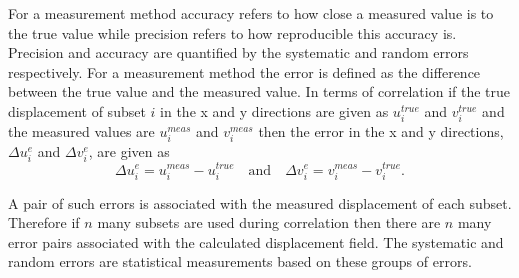 \documentclass[12pt,oneside,openany,a4paper, %
english, %
masters-t, goldenblock]{usthesis}
\begin{document}
For a measurement method accuracy refers to how close a measured value is to the true value while precision refers to how reproducible this accuracy is. Precision and accuracy are quantified by the systematic and random errors respectively. For a measurement method the error is defined as the difference between the true value and the measured value. In terms of correlation if the true displacement of subset $i$ in the x and y directions are given as $u_i^{true}$ and $v_i^{true}$ and the measured values are $u_i^{meas}$ and $v_i^{meas}$ then the error in the x and y directions, $\Delta u_i^e$ and $\Delta v_i^e$, are given as
\begin{equation}
  \label{eq: error}
  \Delta u_i^e = u_i^{meas}-u_i^{true} \quad \text{and} \quad \Delta v_i^e = v_i^{meas}-v_i^{true}.
\end{equation}

A pair of such errors is associated with the measured displacement of each subset. Therefore if $n$ many subsets are used during correlation then there are $n$ many error pairs associated with the calculated displacement field. The systematic and random errors are statistical measurements based on these groups of errors. 


\end{document}
